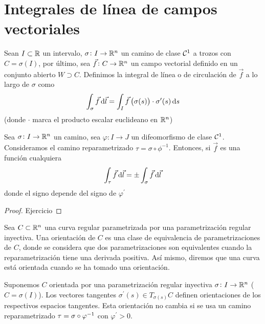 \section{Integrales de línea de campos vectoriales}

\begin{defi}
    Sean $I \subset \mathbb{R}$ un intervalo, $\sigma \colon I \to \mathbb{R}^n$ un camino de clase $\mathcal{C}^1$ a trozos con $C = \sigma(I)$, por último,
    sea $\vec{f} \colon C \to \mathbb{R}^n$ un campo vectorial definido en un conjunto abierto $W \supset C$. Definimos la integral de línea o de circulación
    de $\vec{f}$ a lo largo de $\sigma$ como
    \[
        \int_\sigma \vec{f} \dif \vec{l} = \int_I \vec{f} \left( \sigma(s) \right) \cdot \sigma^\prime(s) \dif s
    \]
    (donde $\cdot$ marca el producto escalar euclideano en $\mathbb{R}^n$)
\end{defi}

\begin{prop}
    Sea $\sigma  \colon I \to \mathbb{R}^n$ un camino, sea $\varphi \colon I \to J$ un difeomorfismo de clase $\mathcal{C}^1$. Consideramos
    el camino reparametrizado $\tau = \sigma \circ \phi^{-1}$. Entonces, si $\vec{f}$ es una función cualquiera
    \[
        \int_\tau \vec{f} \dif \vec{l} = \pm \int_\sigma \vec{f} \dif \vec{l}
    \]
    donde el signo depende del signo de $\varphi^\prime$
\end{prop}

\begin{proof}
    Ejercicio
\end{proof}

\begin{defi}
    Sea $C \subset \mathbb{R}^n$ una curva regular parametrizada por una parametrización regular inyectiva. Una orientación de $C$ es una clase
    de equivalencia de parametrizaciones de $C$, donde se considera que dos parametrizaciones son equivalentes cuando la reparametrización
    tiene una derivada positiva. Así mismo, diremos que una curva está orientada cuando se ha tomado una orientación.
\end{defi}

\begin{obs}
    Suponemos $C$ orientada por una parametrización regular inyectiva $\sigma \colon I \to \mathbb{R}^n$ ($C = \sigma(I)$). Los vectores tangentes
    $\sigma^\prime(s) \in T_{\sigma(s)}C$ definen orientaciones de los respectivos espacios tangentes. Esta orientación no cambia si se usa
    un camino reparametrizado $\tau = \sigma \circ \varphi^{-1}$ con $\varphi^\prime > 0$.
\end{obs}

